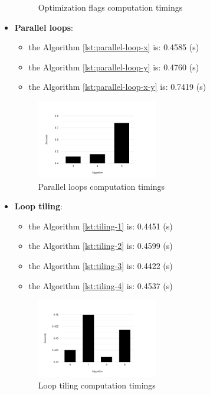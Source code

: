 \documentclass[conference]{IEEEtran}
\begin{document}
\begin{itemize}
\begin{figure}[htbp]
		\caption{Optimization flags computation timings}
		\label{fig:optimization-flags}
	\end{figure}	
	\item \textbf{Parallel loops}: 
	\begin{itemize}
		\item the Algorithm \ref{lst:parallel-loop-x} is: 0.4585 (s)
		\item the Algorithm \ref{lst:parallel-loop-y} is: 0.4760 (s)
		\item the Algorithm \ref{lst:parallel-loop-x-y} is: 0.7419 (s)
	\end{itemize}
	\begin{figure}[htbp]
		\centering
			\includegraphics[width=0.50\textwidth]{parallel-loops.png}
		\caption{Parallel loops computation timings}
		\label{fig:parallel-loops}
	\end{figure}		
	\item \textbf{Loop tiling}: 
	\begin{itemize}
		\item the Algorithm \ref{lst:tiling-1} is: 0.4451 (s)
		\item the Algorithm \ref{lst:tiling-2} is: 0.4599 (s)
		\item the Algorithm \ref{lst:tiling-3} is: 0.4422 (s)
		\item the Algorithm \ref{lst:tiling-4} is: 0.4537 (s)
	\end{itemize}	
	\begin{figure}[htbp]
		\centering
			\includegraphics[width=0.50\textwidth]{loop-tiling.png}
		\caption{Loop tiling computation timings}
		\label{fig:loop-tiling}
	\end{figure}		

\end{itemize}
\end{document}
